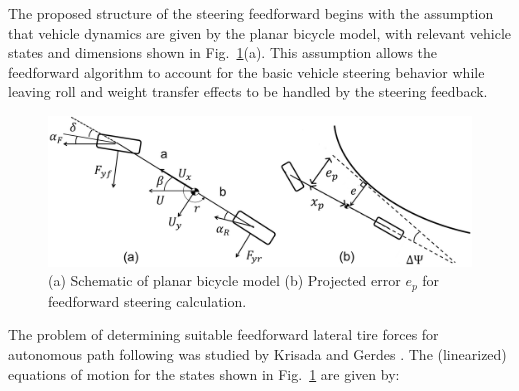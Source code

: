 \documentclass{nVSD2e}
\theoremstyle{plain}
\theoremstyle{definition}
\theoremstyle{remark}
\begin{document}
The proposed structure of the steering feedforward begins with the assumption that vehicle dynamics are given by the planar bicycle model,
 with relevant vehicle states and dimensions shown in Fig.~\ref{fig:bikeModel}(a). 
This assumption allows the feedforward algorithm to account for the basic vehicle
 steering behavior while leaving roll and weight transfer effects to be handled by the steering feedback. 

\begin{figure}[h]
\centering
\includegraphics[width=.9\columnwidth]{figures/BikeModelSchematic.png}
\caption{ (a) Schematic of planar bicycle model (b) Projected error $e_p$ for feedforward steering calculation.}
\label{fig:bikeModel}
\end{figure}

The problem of determining suitable feedforward lateral tire forces for autonomous path following was studied by Krisada and Gerdes \cite{mickcop}. The (linearized) equations of 
motion for the states shown in Fig.~\ref{fig:bikeModel} are given by:
\end{document}
